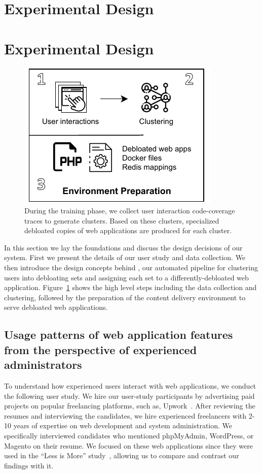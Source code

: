 \section{Experimental Design}\section{Experimental Design}
\label{sec:experiment-design}

\begin{figure}[t]
    \centering
    \includegraphics[]{figures/dbltr/EnvironmentPreparation.pdf}
    \caption{During the training phase, we collect user interaction code-coverage traces to generate clusters. Based on these clusters, specialized debloated copies of web applications are produced for each cluster.}
    \label{fig:environment_preparation}
\end{figure}

In this section we lay the foundations and discuss the design decisions of our system. 
First we present the details of our user study and data collection. 
We then introduce the design concepts behind \dbltr{}, our automated pipeline for clustering users into debloating sets and assigning each set to a differently-debloated web application.
Figure~\ref{fig:environment_preparation} shows the high level steps including the data collection and clustering, followed by the preparation of the content delivery environment to serve debloated web applications.

\subsection{Usage patterns of web application features from the perspective of experienced administrators}

To understand how experienced users interact with web applications, we conduct the following user study. 
We hire our user-study participants by advertising paid projects on popular freelancing platforms, such as, Upwork~\cite{upwork}. 
After reviewing the resumes and interviewing the candidates, we hire experienced freelancers with 2-10 years of expertise on web development and system administration. 
We specifically interviewed candidates who mentioned phpMyAdmin, WordPress, or Magento on their resume. 
We focused on these web applications since they were used in the ``Less is More'' study~\cite{lessismore}, allowing us to compare and contrast our findings with it. 

